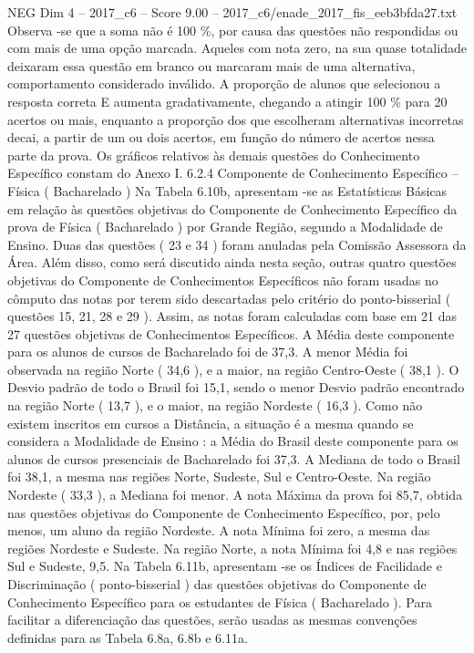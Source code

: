 \begin{textsample}{NEG Dim 4 – 2017\_c6 – Score 9.00 – 2017\_c6/enade\_2017\_fis\_eeb3bfda27.txt}
Observa -se que a soma não é 100 \%, por causa das questões não respondidas ou com mais de uma opção marcada.
Aqueles com nota zero, na sua quase totalidade deixaram essa questão em branco ou marcaram mais de uma alternativa, comportamento considerado inválido.
A proporção de alunos que selecionou a resposta correta E aumenta gradativamente, chegando a atingir 100 \% para 20 acertos ou mais, enquanto a proporção dos que escolheram alternativas incorretas decai, a partir de um ou dois acertos, em função do número de acertos nessa parte da prova.
Os gráficos relativos às demais questões do Conhecimento Específico constam do Anexo I. 6.2.4 Componente de Conhecimento Específico – Física ( Bacharelado ) Na Tabela 6.10b, apresentam -se as Estatísticas Básicas em relação às questões objetivas do Componente de Conhecimento Específico da prova de Física ( Bacharelado ) por Grande Região, segundo a Modalidade de Ensino.
Duas das questões ( 23 e 34 ) foram anuladas pela Comissão Assessora da Área.
Além disso, como será discutido ainda nesta seção, outras quatro questões objetivas do Componente de Conhecimentos Específicos não foram usadas no cômputo das notas por terem sido descartadas pelo critério do ponto-bisserial ( questões 15, 21, 28 e 29 ).
Assim, as notas foram calculadas com base em 21 das 27 questões objetivas de Conhecimentos Específicos.
A Média deste componente para os alunos de cursos de Bacharelado foi de 37,3.
A menor Média foi observada na região Norte ( 34,6 ), e a maior, na região Centro-Oeste ( 38,1 ).
O Desvio padrão de todo o Brasil foi 15,1, sendo o menor Desvio padrão encontrado na região Norte ( 13,7 ), e o maior, na região Nordeste ( 16,3 ).
Como não existem inscritos em cursos a Distância, a situação é a mesma quando se considera a Modalidade de Ensino : a Média do Brasil deste componente para os alunos de cursos presenciais de Bacharelado foi 37,3.
A Mediana de todo o Brasil foi 38,1, a mesma nas regiões Norte, Sudeste, Sul e Centro-Oeste.
Na região Nordeste ( 33,3 ), a Mediana foi menor.
A nota Máxima da prova foi 85,7, obtida nas questões objetivas do Componente de Conhecimento Específico, por, pelo menos, um aluno da região Nordeste.
A nota Mínima foi zero, a mesma das regiões Nordeste e Sudeste.
Na região Norte, a nota Mínima foi 4,8 e nas regiões Sul e Sudeste, 9,5.
Na Tabela 6.11b, apresentam -se os Índices de Facilidade e Discriminação ( ponto-bisserial ) das questões objetivas do Componente de Conhecimento Específico para os estudantes de Física ( Bacharelado ).
Para facilitar a diferenciação das questões, serão usadas as mesmas convenções definidas para as Tabela 6.8a, 6.8b e 6.11a.

\end{textsample}
